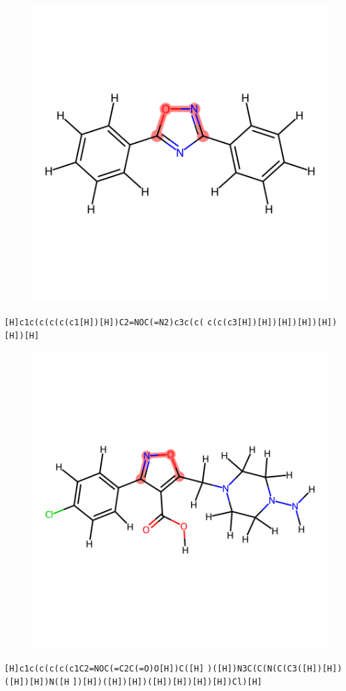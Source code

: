 \documentclass{article}
\begin{document}
\begin{figure}[ht]
\centering
    \includegraphics{mol172.png}
\end{figure}
\verb|[H]c1c(c(c(c(c1[H])[H])C2=NOC(=N2)c3c(c(| \verb|c(c(c3[H])[H])[H])[H])[H])[H])[H]|

\begin{figure}[ht]
\centering
    \includegraphics{mol173.png}
\end{figure}
\verb|[H]c1c(c(c(c(c1C2=NOC(=C2C(=O)O[H])C([H]| \verb|)([H])N3C(C(N(C(C3([H])[H])([H])[H])N([H| \verb|])[H])([H])[H])([H])[H])[H])[H])Cl)[H]|
\end{document}
